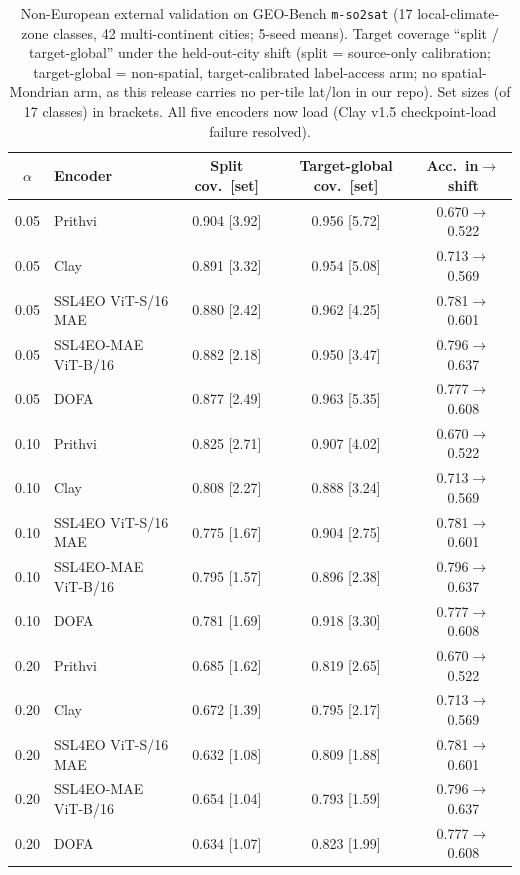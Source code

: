 \documentclass[11pt]{article}
\begin{document}
\begin{table}[t]\centering\small
\caption{Non-European external validation on GEO-Bench \texttt{m-so2sat} (17 local-climate-zone classes,
42 multi-continent cities; 5-seed means). Target coverage ``split / target-global'' under the held-out-city
shift (split = source-only calibration; target-global = non-spatial, target-calibrated label-access arm; no
spatial-Mondrian arm, as this release carries no per-tile lat/lon in our repo). Set sizes (of 17 classes) in
brackets. All five encoders now load (Clay v1.5 checkpoint-load failure resolved).}\label{tab:so2sat}
\begin{tabular}{clccc}
\toprule
$\alpha$ & Encoder & Split cov.\ [set] & Target-global cov.\ [set] & Acc.\ in$\to$shift \\
\midrule
0.05 & Prithvi           & 0.904 [3.92] & 0.956 [5.72] & 0.670$\to$0.522 \\
0.05 & Clay              & 0.891 [3.32] & 0.954 [5.08] & 0.713$\to$0.569 \\
0.05 & SSL4EO ViT-S/16 MAE & 0.880 [2.42] & 0.962 [4.25] & 0.781$\to$0.601 \\
0.05 & SSL4EO-MAE ViT-B/16 & 0.882 [2.18] & 0.950 [3.47] & 0.796$\to$0.637 \\
0.05 & DOFA              & 0.877 [2.49] & 0.963 [5.35] & 0.777$\to$0.608 \\
\midrule
0.10 & Prithvi           & 0.825 [2.71] & 0.907 [4.02] & 0.670$\to$0.522 \\
0.10 & Clay              & 0.808 [2.27] & 0.888 [3.24] & 0.713$\to$0.569 \\
0.10 & SSL4EO ViT-S/16 MAE & 0.775 [1.67] & 0.904 [2.75] & 0.781$\to$0.601 \\
0.10 & SSL4EO-MAE ViT-B/16 & 0.795 [1.57] & 0.896 [2.38] & 0.796$\to$0.637 \\
0.10 & DOFA              & 0.781 [1.69] & 0.918 [3.30] & 0.777$\to$0.608 \\
\midrule
0.20 & Prithvi           & 0.685 [1.62] & 0.819 [2.65] & 0.670$\to$0.522 \\
0.20 & Clay              & 0.672 [1.39] & 0.795 [2.17] & 0.713$\to$0.569 \\
0.20 & SSL4EO ViT-S/16 MAE & 0.632 [1.08] & 0.809 [1.88] & 0.781$\to$0.601 \\
0.20 & SSL4EO-MAE ViT-B/16 & 0.654 [1.04] & 0.793 [1.59] & 0.796$\to$0.637 \\
0.20 & DOFA              & 0.634 [1.07] & 0.823 [1.99] & 0.777$\to$0.608 \\
\bottomrule
\end{tabular}
\end{table}
\end{document}

